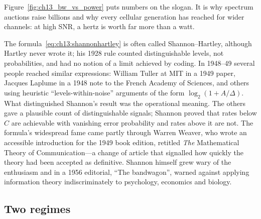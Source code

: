 
Figure~\ref{fig:ch13_bw_vs_power} puts numbers on the slogan. It is why spectrum auctions raise
billions and why every cellular generation has reached for wider channels: at high SNR, a hertz is
worth far more than a watt.

\begin{history}
The formula~\eqref{eq:ch13:shannonhartley} is often called Shannon--Hartley, although Hartley never
wrote it; his 1928 rule counted distinguishable levels, not probabilities, and had no notion of a
limit achieved by coding. In 1948--49 several people reached similar expressions: William Tuller at
MIT in a 1949 paper, Jacques Laplume in a 1948 note to the French Academy of Sciences, and others
using heuristic ``levels-within-noise'' arguments of the form $\log_2(1+A/\Delta)$. What
distinguished Shannon's result was the operational meaning. The others gave a plausible count of
distinguishable signals; Shannon proved that rates below $C$ are achievable with vanishing error
probability and rates above it are not. The formula's widespread fame came partly through Warren
Weaver, who wrote an accessible introduction for the 1949 book edition, retitled \emph{The}
Mathematical Theory of Communication---a change of article that signalled how quickly the theory
had been accepted as definitive. Shannon himself grew wary of the enthusiasm and in a 1956
editorial, ``The bandwagon'', warned against applying information theory indiscriminately to
psychology, economics and biology.
\end{history}

\subsection{Two regimes}


